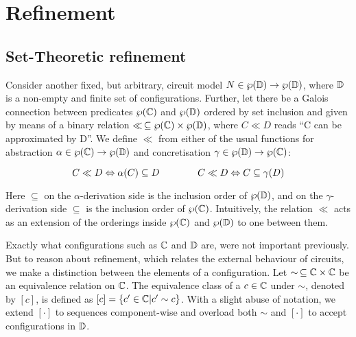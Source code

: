 \section{Refinement}

\subsection{Set-Theoretic refinement}

Consider another fixed, but arbitrary, circuit model $N \in \wp(\mathbb{D}) \rightarrow \wp(\mathbb{D})$, where $\mathbb{D}$ is a non-empty and finite set of configurations. Further, let there be a Galois connection between predicates $\wp(\mathbb{C})$ and $\wp(\mathbb{D})$ ordered by set inclusion and given by means of a binary relation $\ll \, \subseteq \wp(\mathbb{C}) \times \wp(\mathbb{D})$, where $C \ll D$ reads ``C can be approximated by D''. We define $\ll$ from either of the usual functions for abstraction $\alpha \in \wp(\mathbb{C}) \rightarrow \wp(\mathbb{D})$ and concretisation $\gamma \in \wp(\mathbb{D}) \rightarrow \wp(\mathbb{C})$:

\begin{equation*}
C \ll D \Leftrightarrow \alpha(C) \subseteq D \quad\quad\quad\quad C \ll D \Leftrightarrow C \subseteq \gamma(D)
\end{equation*}

\noindent Here $\subseteq$ on the $\alpha$-derivation side is the inclusion order of $\wp(\mathbb{D})$, and on the $\gamma$-derivation side $\subseteq$ is the inclusion order of $\wp(\mathbb{C})$. Intuitively, the relation $\ll$ acts as an extension of the orderings inside $\wp(\mathbb{C})$ and $\wp(\mathbb{D})$ to one between them.


Exactly what configurations such as $\mathbb{C}$ and $\mathbb{D}$ are, were not important previously. But to reason about refinement, which relates the external behaviour of circuits, we make a distinction between the elements of a configuration. Let $\sim \, \subseteq \mathbb{C} \times \mathbb{C}$ be an equivalence relation on $\mathbb{C}$. The equivalence class of a $c \in \mathbb{C}$ under $\sim$, denoted by $[c]$, is defined as $[c] = \{ c' \in \mathbb{C} | c' \sim c \}$. With a slight abuse of notation, we extend $[\cdot]$ to sequences component-wise and overload both $\sim$ and $[\cdot]$ to accept configurations in $\mathbb{D}$.


